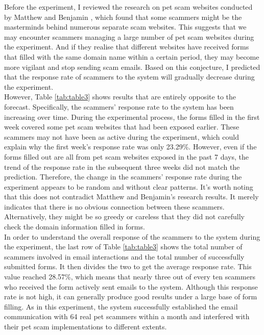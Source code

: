 \documentclass[ oneside,%
                    author={Cassie Qing Tang},
                    degree={BSc},
                     title={An Automated Response System for Disrupting Online Pet Scamming \\ },
                    subtitle={ }]{dissertation}
\begin{document}
Before the experiment, I reviewed the research on pet scam websites conducted by Matthew and Benjamin \cite{price_resource_2020}, which found that some scammers might be the masterminds behind numerous separate scam websites. This suggests that we may encounter scammers managing a large number of pet scam websites during the experiment. And if they realise that different websites have received forms that filled with the same domain name within a certain period, they may become more vigilant and stop sending scam emails. Based on this conjecture, I predicted that the response rate of scammers to the system will gradually decrease during the experiment.
\\

However, Table \ref{tab:table3} shows results that are entirely opposite to the forecast. Specifically, the scammers' response rate to the system has been increasing over time. During the experimental process, the forms filled in the first week covered some pet scam websites that had been exposed earlier. These scammers may not have been as active during the experiment, which could explain why the first week's response rate was only 23.29\%. However, even if the forms filled out are all from pet scam websites exposed in the past 7 days, the trend of the response rate in the subsequent three weeks did not match the prediction. Therefore, the change in the scammers’ response rate during the experiment appears to be random and without clear patterns. It's worth noting that this does not contradict Matthew and Benjamin's research results. It merely indicates that there is no obvious connection between these scammers. Alternatively, they might be so greedy or careless that they did not carefully check the domain information filled in forms.
\\

In order to understand the overall response of the scammers to the system during the experiment, the last row of Table \ref{tab:table3} shows the total number of scammers involved in email interactions and the total number of successfully submitted forms. It then divides the two to get the average response rate. This value reached 28.57\%, which means that nearly three out of every ten scammers who received the form actively sent emails to the system. Although this response rate is not high, it can generally produce good results under a large base of form filling. As in this experiment, the system successfully established the email communication with 64 real pet scammers within a month and interfered with their pet scam implementations to different extents.
\end{document}
